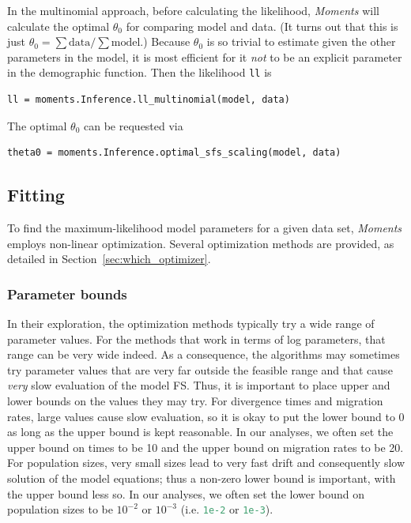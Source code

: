 \documentclass[12pt]{article}
\makeatletter
\newcommand{\py}[1]{\lstinline[language=Python, showstringspaces=False]@#1@}
\makeatother
\begin{document}
In the multinomial approach, before calculating the likelihood, \textit{Moments} will calculate the optimal $\theta_0$ for comparing model and data.
(It turns out that this is just $\theta_0 = \sum \text{data} / \sum \text{model}$.)
Because $\theta_0$ is so trivial to estimate given the other parameters in the model, it is most efficient for it \emph{not} to be an explicit parameter in the demographic function.
Then the likelihood \py{ll} is
\begin{lstlisting}
ll = moments.Inference.ll_multinomial(model, data)
\end{lstlisting}
The optimal $\theta_0$ can be requested via
\begin{lstlisting}
theta0 = moments.Inference.optimal_sfs_scaling(model, data)
\end{lstlisting}

\subsection{Fitting}

To find the maximum-likelihood model parameters for a given data set, \textit{Moments} employs non-linear optimization.
Several optimization methods are provided, as detailed in Section~\ref{sec:which_optimizer}.

\subsubsection{Parameter bounds}

In their exploration, the optimization methods typically try a wide range of parameter values.
For the methods that work in terms of log parameters, that range can be very wide indeed.
As a consequence, the algorithms may sometimes try parameter values that are very far outside the feasible range and that cause \emph{very} slow evaluation of the model FS.
Thus, it is important to place upper and lower bounds on the values they may try.
For divergence times and migration rates, large values cause slow evaluation, so it is okay to put the lower bound to 0 as long as the upper bound is kept reasonable.
In our analyses, we often set the upper bound on times to be 10 and the upper bound on migration rates to be 20.
For population sizes, very small sizes lead to very fast drift and consequently slow solution of the model equations; thus a non-zero lower bound is important, with the upper bound less so.
In our analyses, we often set the lower bound on population sizes to be $10^{-2}$ or $10^{-3}$ (i.e. \py{1e-2} or \py{1e-3}).
\end{document}
